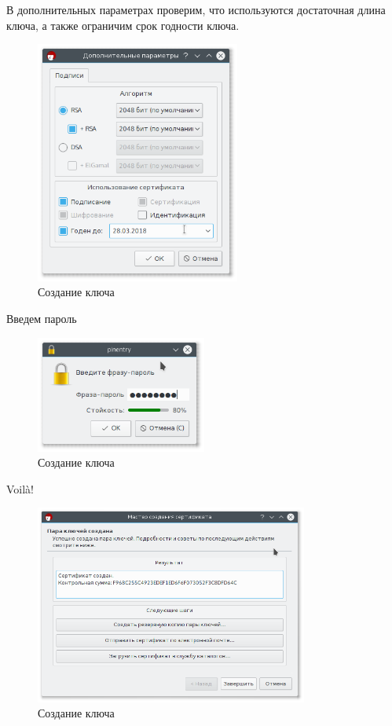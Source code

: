 В дополнительных параметрах проверим, что используются достаточная длина ключа, а также ограничим срок годности ключа.

\begin{figure}[H]
	\centering
	\includegraphics[width=0.6\textwidth]{figures/screen5.png}
	\caption{Создание ключа}
\end{figure}

Введем пароль

\begin{figure}[H]
	\centering
	\includegraphics[width=0.5\textwidth]{figures/screen6.png}
	\caption{Создание ключа}
\end{figure}

Voilà!

\begin{figure}[H]
	\centering
	\includegraphics[width=0.8\textwidth]{figures/screen7.png}
	\caption{Создание ключа}
\end{figure}

